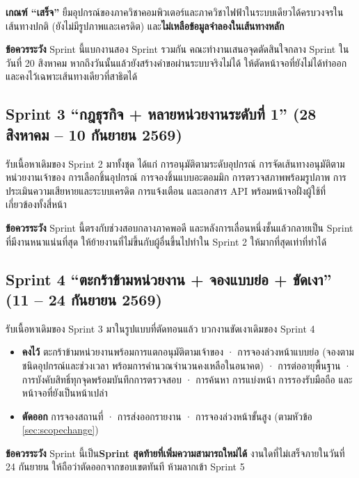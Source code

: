 \noindent\textbf{เกณฑ์ ``เสร็จ''} ยืมอุปกรณ์ของภาควิชาคอมพิวเตอร์และภาควิชาไฟฟ้าในระบบเดียวได้ครบวงจรในเส้นทางปกติ (ยังไม่มีรูปภาพและเครดิต) และ\textbf{ไม่เหลือข้อมูลจำลองในเส้นทางหลัก}

\noindent\textbf{ข้อควรระวัง} Sprint นี้แบกงานสอง Sprint รวมกัน คณะทำงานเสนอจุดตัดสินใจกลาง Sprint ในวันที่ 20 สิงหาคม หากถึงวันนั้นแล้วยังสร้างคำขอผ่านระบบจริงไม่ได้ ให้ตัดหน้าจอที่ยังไม่ได้ทำออกและคงไว้เฉพาะเส้นทางเดียวที่สาธิตได้

\subsection{Sprint 3 ``กฎธุรกิจ + หลายหน่วยงานระดับที่ 1'' (28 สิงหาคม – 10 กันยายน 2569)}

รับเนื้อหาเดิมของ Sprint 2 มาทั้งชุด ได้แก่ การอนุมัติตามระดับอุปกรณ์ การจัดเส้นทางอนุมัติตามหน่วยงานเจ้าของ การเลือกชิ้นอุปกรณ์ การจองชิ้นแบบอะตอมมิก การตรวจสภาพพร้อมรูปภาพ การประเมินความเสียหายและระบบเครดิต การแจ้งเตือน และเอกสาร API พร้อมหน้าจอฝั่งผู้ใช้ที่เกี่ยวข้องทั้งสี่หน้า

\noindent\textbf{ข้อควรระวัง} Sprint นี้ตรงกับช่วงสอบกลางภาคพอดี และหลังการเลื่อนหนึ่งชั้นแล้วกลายเป็น Sprint ที่มีงานหนาแน่นที่สุด ให้ย้ายงานที่ไม่ขึ้นกับผู้อื่นขึ้นไปทำใน Sprint 2 ให้มากที่สุดเท่าที่ทำได้

\subsection{Sprint 4 ``ตะกร้าข้ามหน่วยงาน + จองแบบย่อ + ขัดเงา'' (11 – 24 กันยายน 2569)}

รับเนื้อหาเดิมของ Sprint 3 มาในรูปแบบที่ตัดทอนแล้ว บวกงานขัดเงาเดิมของ Sprint 4

\begin{itemize}
  \item \textbf{คงไว้} ตะกร้าข้ามหน่วยงานพร้อมการแตกอนุมัติตามเจ้าของ · การจองล่วงหน้าแบบย่อ (จองตามชนิดอุปกรณ์และช่วงเวลา พร้อมการคำนวณจำนวนคงเหลือในอนาคต) · การต่ออายุพื้นฐาน · การบังคับสิทธิ์ทุกจุดพร้อมบันทึกการตรวจสอบ · การค้นหา การแบ่งหน้า การรองรับมือถือ และหน้าจอที่ยังเป็นหน้าเปล่า
  \item \textbf{ตัดออก} การจองสถานที่ · การส่งออกรายงาน · การจองล่วงหน้าขั้นสูง (ตามหัวข้อ \ref{sec:scopechange})
\end{itemize}

\noindent\textbf{ข้อควรระวัง} Sprint นี้เป็น\textbf{Sprint สุดท้ายที่เพิ่มความสามารถใหม่ได้} งานใดที่ไม่เสร็จภายในวันที่ 24 กันยายน ให้ถือว่าตัดออกจากขอบเขตทันที ห้ามลากเข้า Sprint 5

